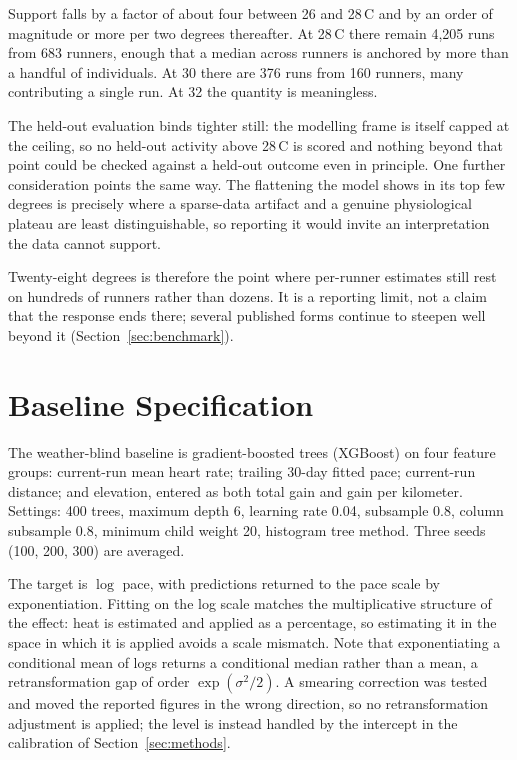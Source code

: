 Support falls by a factor of about four between 26 and 28\,\textdegree C and by an order of magnitude or more per two degrees thereafter. At 28\,\textdegree C there
remain 4{,}205 runs from 683 runners, enough that a median across runners is anchored by more than a
handful of individuals. At 30 there are 376 runs from 160 runners, many contributing a single run. At
32 the quantity is meaningless.

The held-out evaluation binds tighter still: the modelling frame is itself capped at the ceiling, so no
held-out activity above 28\,\textdegree C is scored and nothing beyond that point could be checked
against a held-out outcome even in principle. One further
consideration points the same way. The flattening the model shows in its top few degrees is precisely where a sparse-data
artifact and a genuine physiological plateau are least distinguishable, so reporting it would invite an
interpretation the data cannot support.

Twenty-eight degrees is therefore the point where per-runner estimates still rest on hundreds of runners
rather than dozens. It is a reporting limit, not a claim that the response ends there; several published
forms continue to steepen well beyond it (Section~\ref{sec:benchmark}).

\section{Baseline Specification}
\label{app:baseline}

The weather-blind baseline is gradient-boosted trees (XGBoost) on four feature groups: current-run
mean heart rate; trailing 30-day fitted pace; current-run distance; and elevation, entered as both
total gain and gain per kilometer. Settings: 400 trees, maximum depth 6, learning rate 0.04, subsample
0.8, column subsample 0.8, minimum child weight 20, histogram tree method. Three seeds (100, 200,
300) are averaged.

The target is $\log$ pace, with predictions returned to the pace scale by exponentiation. Fitting on
the log scale matches the multiplicative structure of the effect: heat is estimated and applied as a
percentage, so estimating it in the space in which it is applied avoids a scale mismatch. Note that
exponentiating a conditional mean of logs returns a conditional median rather than a mean, a
retransformation gap of order $\exp(\sigma^2/2)$. A smearing correction was tested and moved the
reported figures in the wrong direction, so no retransformation adjustment is applied; the level is
instead handled by the intercept in the calibration of Section~\ref{sec:methods}.

